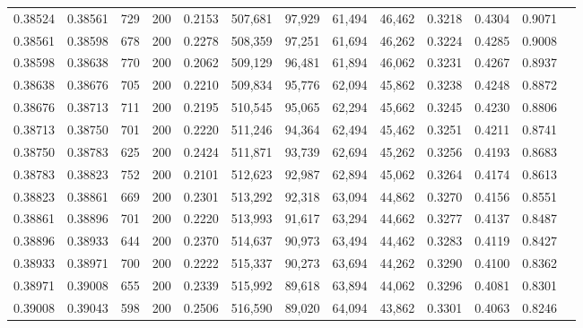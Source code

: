 \begin{tabular}{rrrrrrrrrrrrr}
0.38524 & 0.38561 &   729 & 200 &                                     0.2153 & 507,681 &  97,929 &  61,494 &  46,462 & 0.3218 & 0.4304 & 0.9071 \\
0.38561 & 0.38598 &   678 & 200 &                                     0.2278 & 508,359 &  97,251 &  61,694 &  46,262 & 0.3224 & 0.4285 & 0.9008 \\
0.38598 & 0.38638 &   770 & 200 &                                     0.2062 & 509,129 &  96,481 &  61,894 &  46,062 & 0.3231 & 0.4267 & 0.8937 \\
0.38638 & 0.38676 &   705 & 200 &                                     0.2210 & 509,834 &  95,776 &  62,094 &  45,862 & 0.3238 & 0.4248 & 0.8872 \\
0.38676 & 0.38713 &   711 & 200 &                                     0.2195 & 510,545 &  95,065 &  62,294 &  45,662 & 0.3245 & 0.4230 & 0.8806 \\
0.38713 & 0.38750 &   701 & 200 &                                     0.2220 & 511,246 &  94,364 &  62,494 &  45,462 & 0.3251 & 0.4211 & 0.8741 \\
0.38750 & 0.38783 &   625 & 200 &                                     0.2424 & 511,871 &  93,739 &  62,694 &  45,262 & 0.3256 & 0.4193 & 0.8683 \\
0.38783 & 0.38823 &   752 & 200 &                                     0.2101 & 512,623 &  92,987 &  62,894 &  45,062 & 0.3264 & 0.4174 & 0.8613 \\
0.38823 & 0.38861 &   669 & 200 &                                     0.2301 & 513,292 &  92,318 &  63,094 &  44,862 & 0.3270 & 0.4156 & 0.8551 \\
0.38861 & 0.38896 &   701 & 200 &                                     0.2220 & 513,993 &  91,617 &  63,294 &  44,662 & 0.3277 & 0.4137 & 0.8487 \\
0.38896 & 0.38933 &   644 & 200 &                                     0.2370 & 514,637 &  90,973 &  63,494 &  44,462 & 0.3283 & 0.4119 & 0.8427 \\
0.38933 & 0.38971 &   700 & 200 &                                     0.2222 & 515,337 &  90,273 &  63,694 &  44,262 & 0.3290 & 0.4100 & 0.8362 \\
0.38971 & 0.39008 &   655 & 200 &                                     0.2339 & 515,992 &  89,618 &  63,894 &  44,062 & 0.3296 & 0.4081 & 0.8301 \\
0.39008 & 0.39043 &   598 & 200 &                                     0.2506 & 516,590 &  89,020 &  64,094 &  43,862 & 0.3301 & 0.4063 & 0.8246 \\

\end{tabular}
